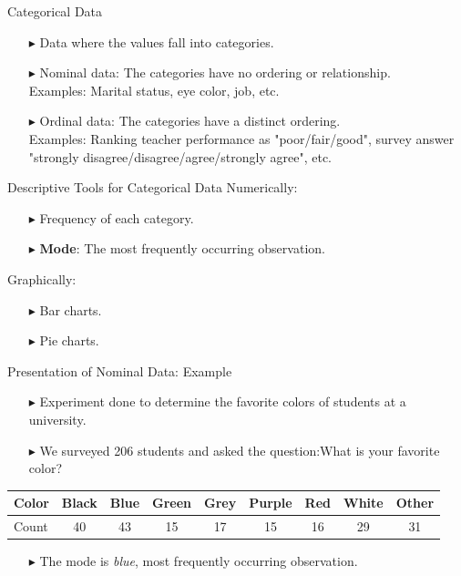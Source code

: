 \documentclass[12pt]{beamer}
\begin{document}
\begin{frame}{Categorical Data}
	\begin{itemize}
		\item[$\blacktriangleright$] Data where the values fall into categories.
		\item[$\blacktriangleright$] Nominal data: The categories have no ordering or relationship.\medskip\\
		Examples: Marital status, eye color, job, etc.
		\item[$\blacktriangleright$] Ordinal data: The categories have a distinct ordering.\medskip\\
		Examples: Ranking teacher performance as "poor/fair/good", survey answer "strongly disagree/disagree/agree/strongly agree", etc.
	\end{itemize}
\end{frame}
\begin{frame}{Descriptive Tools for Categorical Data}
	Numerically:
	\begin{itemize}
	\item[$\blacktriangleright$]Frequency of each category.
	\item[$\blacktriangleright$] {\bf Mode}: The most frequently occurring observation.
	\end{itemize}
	Graphically:
	\begin{itemize}
		\item[$\blacktriangleright$] Bar charts.
		\item[$\blacktriangleright$] Pie charts.
	\end{itemize}
\end{frame}
\begin{frame}{Presentation of Nominal Data: Example}
	\begin{itemize}
		\item[$\blacktriangleright$] Experiment done to determine the favorite colors of students at a university.
		\item[$\blacktriangleright$] We surveyed 206 students and asked the question:What is your favorite color?
	\end{itemize}
\vspace{0.5cm}
\begin{tabular}{|l|c|c|c|c|c|c|c|c|}
	\hline
	Color & Black & Blue & Green & Grey & Purple & Red & White & Other \\
	\hline
	Count & 40 & 43 & 15 & 17 & 15 & 16 & 29 & 31 \\
	\hline
\end{tabular}
\vspace{0.5cm}
\begin{itemize}
	\item[$\blacktriangleright$]  The mode is {\sl\color{blue} blue}, most frequently occurring observation.
\end{itemize}
\end{frame}
\end{document}
